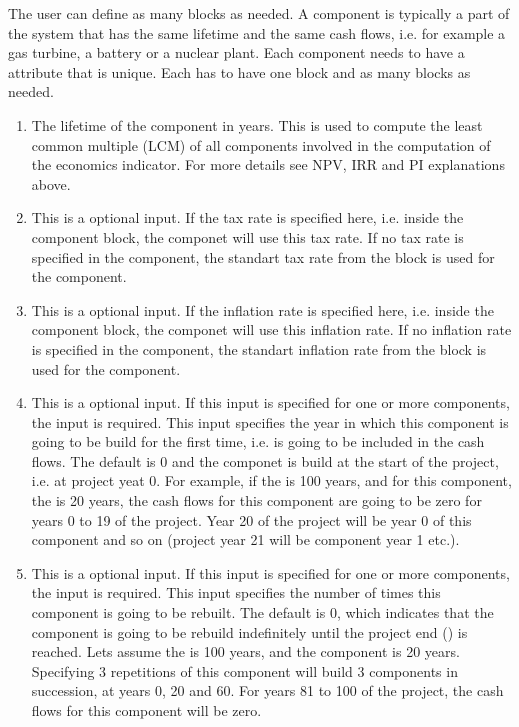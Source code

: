 The user can define as many  blocks as needed. A component is typically a part of the system that has the same lifetime and the same cash flows, 
i.e. for example a gas turbine, a battery or a nuclear plant. Each component needs to have a  attribute that is unique. Each  has to have
 one  block and as many  blocks as needed.

\begin{enumerate}
\item[\xmlNode{Life\_time}] The lifetime of the component in years. This is used to compute the least common multiple (LCM) of all components involved in the
 computation of the economics indicator. For more details see NPV, IRR and PI explanations above.

\item[\xmlNode{tax}] This is a optional input. If the tax rate is specified here, i.e. inside the component block, the componet will use this tax rate. If no tax rate is specified in the component, the standart tax rate from the  block is used for the component.
\item[\xmlNode{inflation}] This is a optional input. If the inflation rate is specified here, i.e. inside the component block, the componet will use this inflation rate. If no inflation rate is specified in the component, the standart inflation rate from the  block is used for the component.

\item[\xmlNode{StartTime}] This is a optional input. If this input is specified for one or more components, the  input  is required. This input specifies the year in which this component is going to be build for the first time, i.e. is going to be included in the cash flows. The default is 0 and the componet is build at the start of the project, i.e. at project yeat 0. For example, if the  is 100 years, and for this component, the  is 20 years, the cash flows for this component are going to be zero for years 0 to 19 of the project. Year 20 of the project will be year 0 of this component and so on (project year 21 will be component year 1 etc.).
\item[\xmlNode{Repetitions}] This is a optional input. If this input is specified for one or more components, the  input  is required. This input specifies the number of times this component is going to be rebuilt. The default is 0, which indicates that the component is going to be rebuild indefinitely until the project end () is reached. Lets assume the  is 100 years, and the component  is 20 years. Specifying 3 repetitions of this component will build 3 components in succession, at years 0, 20 and 60. For years 81 to 100 of the project, the cash flows for this component will be zero.


\end{enumerate}
